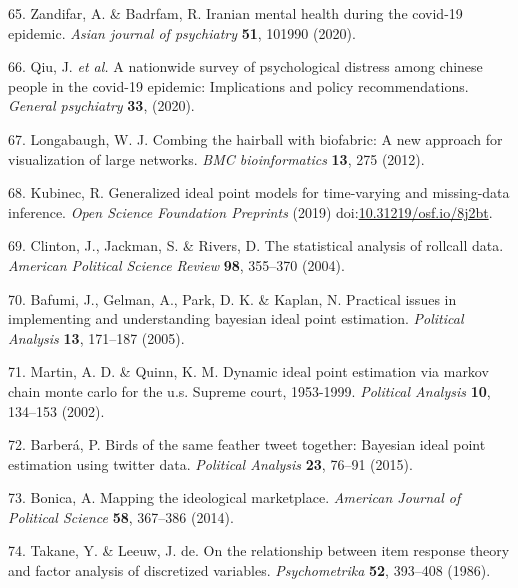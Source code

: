 \documentclass[
]{article}
\newenvironment{cslreferences}%
  {}%
  {\par}
\begin{document}
\begin{cslreferences}
\leavevmode\hypertarget{ref-zandifar2020iranian}{}%
65. Zandifar, A. \& Badrfam, R. Iranian mental health during the covid-19 epidemic. \emph{Asian journal of psychiatry} \textbf{51}, 101990 (2020).

\leavevmode\hypertarget{ref-qiu2020nationwide}{}%
66. Qiu, J. \emph{et al.} A nationwide survey of psychological distress among chinese people in the covid-19 epidemic: Implications and policy recommendations. \emph{General psychiatry} \textbf{33}, (2020).

\leavevmode\hypertarget{ref-longabaugh2012}{}%
67. Longabaugh, W. J. Combing the hairball with biofabric: A new approach for visualization of large networks. \emph{BMC bioinformatics} \textbf{13}, 275 (2012).

\leavevmode\hypertarget{ref-kubinec2019ideal}{}%
68. Kubinec, R. Generalized ideal point models for time-varying and missing-data inference. \emph{Open Science Foundation Preprints} (2019) doi:\href{https://doi.org/10.31219/osf.io/8j2bt}{10.31219/osf.io/8j2bt}.

\leavevmode\hypertarget{ref-jackman2004}{}%
69. Clinton, J., Jackman, S. \& Rivers, D. The statistical analysis of rollcall data. \emph{American Political Science Review} \textbf{98}, 355--370 (2004).

\leavevmode\hypertarget{ref-gelman2005}{}%
70. Bafumi, J., Gelman, A., Park, D. K. \& Kaplan, N. Practical issues in implementing and understanding bayesian ideal point estimation. \emph{Political Analysis} \textbf{13}, 171--187 (2005).

\leavevmode\hypertarget{ref-quinn2002}{}%
71. Martin, A. D. \& Quinn, K. M. Dynamic ideal point estimation via markov chain monte carlo for the u.s. Supreme court, 1953-1999. \emph{Political Analysis} \textbf{10}, 134--153 (2002).

\leavevmode\hypertarget{ref-barbera2015}{}%
72. Barberá, P. Birds of the same feather tweet together: Bayesian ideal point estimation using twitter data. \emph{Political Analysis} \textbf{23}, 76--91 (2015).

\leavevmode\hypertarget{ref-bonica2014}{}%
73. Bonica, A. Mapping the ideological marketplace. \emph{American Journal of Political Science} \textbf{58}, 367--386 (2014).

\leavevmode\hypertarget{ref-takane1986}{}%
74. Takane, Y. \& Leeuw, J. de. On the relationship between item response theory and factor analysis of discretized variables. \emph{Psychometrika} \textbf{52}, 393--408 (1986).


\end{cslreferences}
\end{document}
